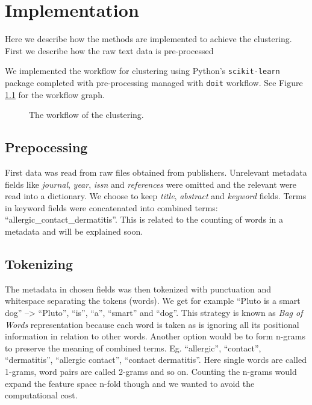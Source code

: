 \chapter{Implementation}
\label{chapter:implementation}


Here we describe how the methods are implemented to achieve the 
clustering. First we describe how the raw text data is 
pre-processed 

We implemented the workflow for clustering using Python's 
\texttt{scikit-learn} package completed with 
pre-processing managed with \texttt{doit} workflow. See Figure 
\ref{fig:wf} for the workflow graph.

\begin{figure}[ht]
  \begin{center}    
    
    \caption{The workflow of the clustering.}
    \label{fig:wf}
  \end{center}
\end{figure}

\section{Prepocessing}
First data was read from raw files obtained from publishers. 
Unrelevant metadata fields like \emph{journal}, \emph{year}, 
\emph{issn} and \emph{references} were omitted and the relevant 
were read into a dictionary. We choose to keep \emph{title}, 
\emph{abstract} and \emph{keyword} fields. Terms in keyword 
fields were concatenated into combined 
terms: ``allergic\_contact\_dermatitis''. This is related 
to the counting of words in a metadata and will be explained 
soon.

\section{Tokenizing}
The metadata in chosen fields was then tokenized with
punctuation and whitespace separating the tokens (words). We 
get for example ``Pluto is a smart dog'' --> ``Pluto'', ``is'', 
``a'', ``smart'' and ``dog''. This strategy is known as \emph{Bag 
of Words} representation because each word is taken as is 
ignoring all its positional information in relation to other 
words. Another option would be to form n-grams to preserve the 
meaning of combined terms. Eg. ``allergic'', ``contact'', 
``dermatitis'', ``allergic contact'', ``contact dermatitis''. Here 
single words are called 1-grams, word pairs are called 2-grams and 
so on. Counting the n-grams would expand the feature space n-fold 
though and we wanted to avoid the computational cost.

